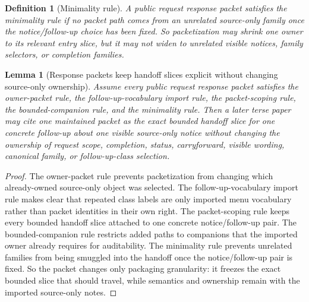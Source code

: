 \documentclass[11pt]{article}
\newtheorem{definition}{Definition}
\newtheorem{lemma}{Lemma}
\begin{document}
\begin{definition}[Minimality rule]
A public request response packet satisfies the \emph{minimality rule} if no packet path comes from an unrelated source-only family once the notice/follow-up choice has been fixed.
So packetization may shrink one owner to its relevant entry slice, but it may not widen to unrelated visible notices, family selectors, or completion families.
\end{definition}

\begin{lemma}[Response packets keep handoff slices explicit without changing source-only ownership]
Assume every public request response packet satisfies the owner-packet rule, the follow-up-vocabulary import rule, the packet-scoping rule, the bounded-companion rule, and the minimality rule.
Then a later terse paper may cite one maintained packet as the exact bounded handoff slice for one concrete follow-up about one visible source-only notice without changing the ownership of request scope, completion, status, carryforward, visible wording, canonical family, or follow-up-class selection.
\end{lemma}

\begin{proof}
The owner-packet rule prevents packetization from changing which already-owned source-only object was selected.
The follow-up-vocabulary import rule makes clear that repeated class labels are only imported menu vocabulary rather than packet identities in their own right.
The packet-scoping rule keeps every bounded handoff slice attached to one concrete notice/follow-up pair.
The bounded-companion rule restricts added paths to companions that the imported owner already requires for auditability.
The minimality rule prevents unrelated families from being smuggled into the handoff once the notice/follow-up pair is fixed.
So the packet changes only packaging granularity: it freezes the exact bounded slice that should travel, while semantics and ownership remain with the imported source-only notes.\qedhere
\end{proof}
\end{document}
